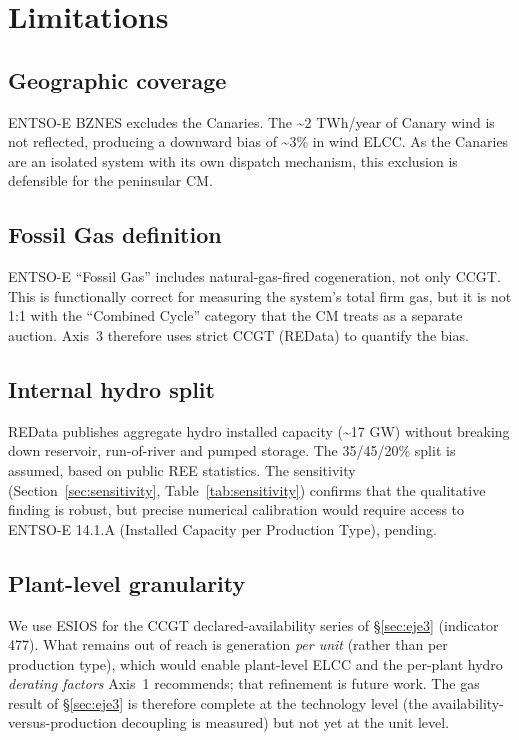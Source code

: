 \documentclass[11pt,a4paper]{article}
\begin{document}
\section{Limitations}

\subsection{Geographic coverage}

ENTSO-E BZN\textbar ES excludes the Canaries. The \textasciitilde 2 TWh/year of
Canary wind is not reflected, producing a downward bias of \textasciitilde 3\% in
wind ELCC. As the Canaries are an isolated system with its own dispatch mechanism,
this exclusion is defensible for the peninsular CM.

\subsection{Fossil Gas definition}

ENTSO-E ``Fossil Gas'' includes natural-gas-fired cogeneration, not only CCGT. This
is functionally correct for measuring the system's total firm gas, but it is not
1:1 with the ``Combined Cycle'' category that the CM treats as a separate auction.
Axis~3 therefore uses strict CCGT (REData) to quantify the bias.

\subsection{Internal hydro split}

REData publishes aggregate hydro installed capacity (\textasciitilde 17 GW) without
breaking down reservoir, run-of-river and pumped storage. The 35/45/20\% split is
assumed, based on public REE statistics. The sensitivity
(Section~\ref{sec:sensitivity}, Table~\ref{tab:sensitivity}) confirms that the
qualitative finding is robust, but precise numerical calibration would require
access to ENTSO-E 14.1.A (Installed Capacity per Production Type), pending.

\subsection{Plant-level granularity}

We use ESIOS for the CCGT declared-availability series of \S\ref{sec:eje3} (indicator
477). What remains out of reach is generation \emph{per unit} (rather than per
production type), which would enable plant-level ELCC and the per-plant hydro
\emph{derating factors} Axis~1 recommends; that refinement is future work. The gas
result of \S\ref{sec:eje3} is therefore complete at the technology level (the
availability-versus-production decoupling is measured) but not yet at the unit level.
\end{document}
